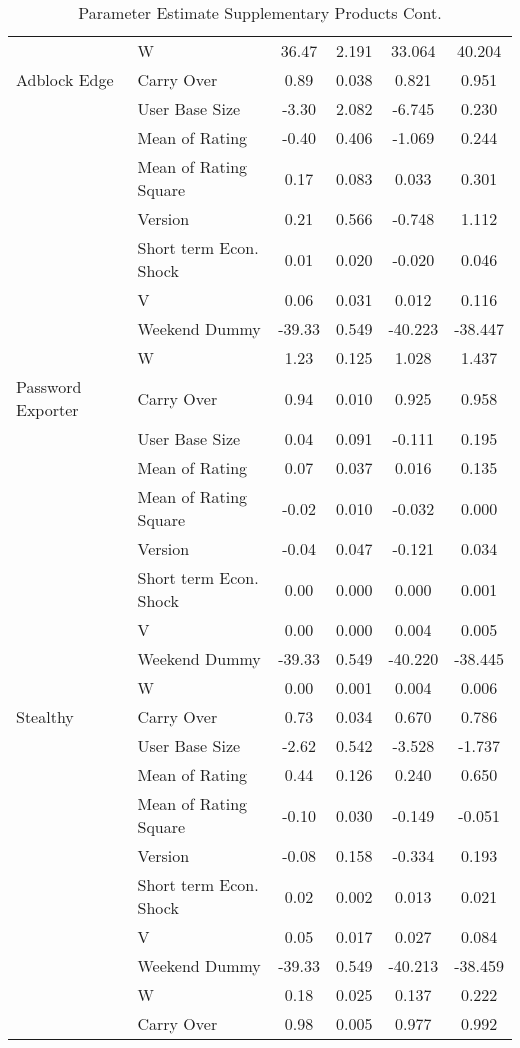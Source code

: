 \documentclass[mksc,nonblindrev]{informs3}
\begin{document}
\begin{table}
\begin{tabular}{llcccc}
	&	W	&	36.47	&	2.191	&	33.064	&	40.204	\\
Adblock Edge	&	Carry Over	&	0.89	&	0.038	&	0.821	&	0.951	\\
	&	User Base Size	&	-3.30	&	2.082	&	-6.745	&	0.230	\\
	&	Mean of Rating	&	-0.40	&	0.406	&	-1.069	&	0.244	\\
	&	Mean of Rating Square	&	0.17	&	0.083	&	0.033	&	0.301	\\
	&	Version	&	0.21	&	0.566	&	-0.748	&	1.112	\\
	&	Short term Econ. Shock	&	0.01	&	0.020	&	-0.020	&	0.046	\\
	&	V	&	0.06	&	0.031	&	0.012	&	0.116	\\
	&	Weekend Dummy	&	-39.33	&	0.549	&	-40.223	&	-38.447	\\
	&	W	&	1.23	&	0.125	&	1.028	&	1.437	\\
Password Exporter 	&	Carry Over	&	0.94	&	0.010	&	0.925	&	0.958	\\
	&	User Base Size	&	0.04	&	0.091	&	-0.111	&	0.195	\\
	&	Mean of Rating	&	0.07	&	0.037	&	0.016	&	0.135	\\
	&	Mean of Rating Square	&	-0.02	&	0.010	&	-0.032	&	0.000	\\
	&	Version	&	-0.04	&	0.047	&	-0.121	&	0.034	\\
	&	Short term Econ. Shock	&	0.00	&	0.000	&	0.000	&	0.001	\\
	&	V	&	0.00	&	0.000	&	0.004	&	0.005	\\
	&	Weekend Dummy	&	-39.33	&	0.549	&	-40.220	&	-38.445	\\
	&	W	&	0.00	&	0.001	&	0.004	&	0.006	\\
Stealthy	&	Carry Over	&	0.73	&	0.034	&	0.670	&	0.786	\\
	&	User Base Size	&	-2.62	&	0.542	&	-3.528	&	-1.737	\\
	&	Mean of Rating	&	0.44	&	0.126	&	0.240	&	0.650	\\
	&	Mean of Rating Square	&	-0.10	&	0.030	&	-0.149	&	-0.051	\\
	&	Version	&	-0.08	&	0.158	&	-0.334	&	0.193	\\
	&	Short term Econ. Shock	&	0.02	&	0.002	&	0.013	&	0.021	\\
	&	V	&	0.05	&	0.017	&	0.027	&	0.084	\\
	&	Weekend Dummy	&	-39.33	&	0.549	&	-40.213	&	-38.459	\\
	&	W	&	0.18	&	0.025	&	0.137	&	0.222	\\
	&	Carry Over	&	0.98	&	0.005	&	0.977	&	0.992	\\
		\end{tabular}
	\caption{Parameter Estimate Supplementary Products Cont.}
	\label{tab:ParameterEstimateSupplementaryProducts}
\end{table}
\end{document}
